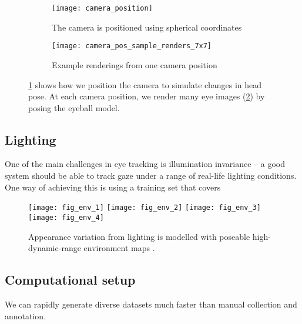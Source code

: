 \begin{figure}
    \centering
    \begin{subfigure}[t]{0.48\columnwidth}
        \texttt{[image: camera\_position]}
        \caption{The camera is positioned using spherical coordinates}
        \label{fig:cam_pos_spher_coords}
    \end{subfigure}
    \hfill
    \begin{subfigure}[t]{0.48\columnwidth}
        \texttt{[image: camera\_pos\_sample\_renders\_7x7]}
        \caption{Example renderings from one camera position}
        \label{fig:cam_pos_example_renders}
    \end{subfigure}
    \caption{\ref{fig:cam_pos_spher_coords} shows how we position the camera to simulate changes in head pose. At each camera position, we render many eye images (\ref{fig:cam_pos_example_renders}) by posing the eyeball model.}
    \label{fig:cam_pos}
\end{figure}

\subsection{Lighting}

One of the main challenges in eye tracking is illumination invariance -- a good system should be able to track gaze under a range of real-life lighting conditions. One way of achieving this is using a training set that covers 

\begin{figure}
    \texttt{[image: fig\_env\_1]} \hfill
    \texttt{[image: fig\_env\_2]} \hfill
    \texttt{[image: fig\_env\_3]} \hfill
    \texttt{[image: fig\_env\_4]}
    \caption{Appearance variation from lighting is modelled with poseable high-dynamic-range environment maps \cite{debevec2002image}.}
    \label{fig:participants}
\end{figure}

\subsection{Computational setup}

We can rapidly generate diverse datasets much faster than manual collection and annotation.